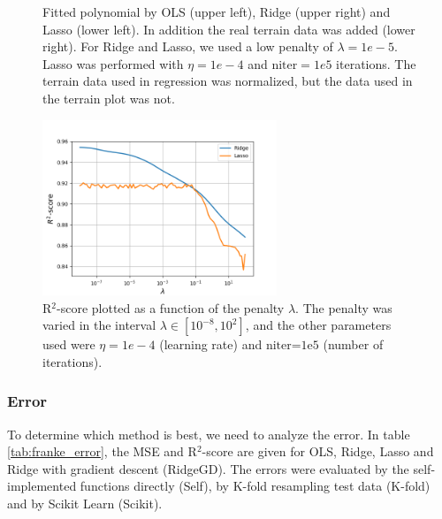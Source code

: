 \begin{figure} [H]
	\caption{Fitted polynomial by OLS (upper left), Ridge (upper right) and Lasso (lower left). In addition the real terrain data was added (lower right). For Ridge and Lasso, we used a low penalty of $\lambda=1e-5$. Lasso was performed with $\eta=1e-4$ and $\text{niter}=1e5$ iterations. The terrain data used in regression was normalized, but the data used in the terrain plot was not.}%
	\label{fig:terrain_plots}%
\end{figure}
\begin{figure} [H]
	\centering
	\includegraphics[width=7cm]{../plots/lambda_R2score_terrain.png}
	\caption{R$^2$-score plotted as a function of the penalty $\lambda$. The penalty was varied in the interval $\lambda\in[10^{-8},10^2]$, and the other parameters used were $\eta=1e-4$ (learning rate) and $\text{niter=1e5}$ (number of iterations).}
	\label{fig:R2_scores_terrain}
\end{figure}
\restoregeometry


\subsubsection{Error}
To determine which method is best, we need to analyze the error. In table \eqref{tab:franke_error}, the MSE and R$^2$-score are given for OLS, Ridge, Lasso and Ridge with gradient descent (RidgeGD). The errors were evaluated by the self-implemented functions directly (Self), by K-fold resampling test data (K-fold) and by Scikit Learn (Scikit).

